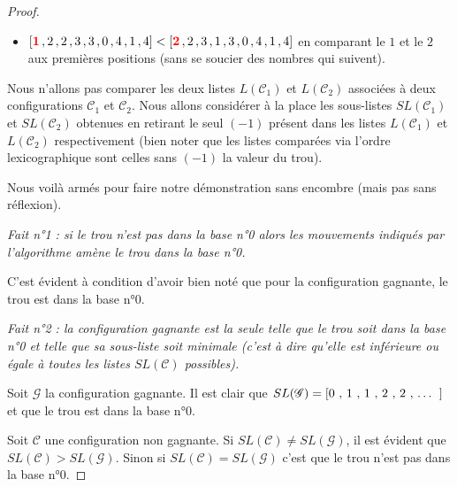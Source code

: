 \begin{proof}
\begin{itemize}
        \medskip

        \item[\textbullet] $[\text{\color{red} \textbf{1}} \, , 2 \, , 2 \, , 3 \, , 3 \, , 0 \, , 4 \, , 1 \, , 4] < [\text{\color{red} \textbf{2}} \, , 2 \, , 3 \, , 1 \, , 3 \, , 0 \, , 4 \, , 1 \, , 4]$
        en comparant le $1$ et le $2$ aux premières positions (sans se soucier des nombres qui suivent).
    \end{itemize}


    \medskip

    Nous n'allons pas comparer les deux listes $L(\mathscr{C}_1)$ et $L(\mathscr{C}_2)$ associées à deux configurations $\mathscr{C}_1$ et $\mathscr{C}_2$. Nous allons considérer à la place les sous-listes $SL(\mathscr{C}_1)$ et $SL(\mathscr{C}_2)$ obtenues en retirant le seul $(-1)$ présent dans les listes $L(\mathscr{C}_1)$ et $L(\mathscr{C}_2)$ respectivement (bien noter que les listes comparées via l'ordre lexicographique sont celles sans $(-1)$ la valeur du trou).


    \medskip

    Nous voilà armés pour faire notre démonstration sans encombre (mais pas sans réflexion).


    \medskip

    \textit{Fait n°1 : si le trou n'est pas dans la base n°0 alors les mouvements indiqués par l'algorithme amène le trou dans la base n°0.}


    \medskip

    C'est évident à condition d'avoir bien noté que pour la configuration gagnante, le trou est dans la base n°0.


    \medskip

    \textit{Fait n°2 : la configuration gagnante est la seule telle que le trou soit dans la base n°0 et telle que sa sous-liste soit minimale (c'est à dire qu'elle est inférieure ou égale à toutes les listes $SL(\mathscr{C})$ possibles).}


    \medskip

    Soit $\mathscr{G}$ la configuration gagnante. Il est clair que
    $SL(\mathscr{G}) = \text{[0 , 1 , 1 , 2 , 2 , \dots{} ]}$
    et que le trou est dans la base n°0.


    \medskip

    Soit $\mathscr{C}$ une configuration non gagnante. Si $SL(\mathscr{C}) \neq SL(\mathscr{G})$, il est évident que $SL(\mathscr{C}) > SL(\mathscr{G})$. Sinon si $SL(\mathscr{C}) = SL(\mathscr{G})$ c'est que le trou n'est pas dans la base n°0.



\end{proof}
